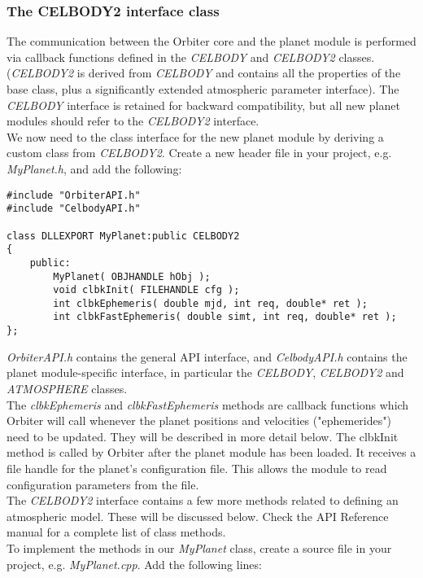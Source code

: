 \documentclass[Orbiter Developer Manual.tex]{subfiles}
\begin{document}
\subsubsection{The CELBODY2 interface class}
The communication between the Orbiter core and the planet module is performed via callback functions defined in the \textit{CELBODY} and \textit{CELBODY2} classes. (\textit{CELBODY2} is derived from \textit{CELBODY} and contains all the properties of the base class, plus a significantly extended atmospheric parameter interface). The \textit{CELBODY} interface is retained for backward compatibility, but all new planet modules should refer to the \textit{CELBODY2} interface.\\
We now need to the class interface for the new planet module by deriving a custom class from \textit{CELBODY2}. Create a new header file in your project, e.g. \textit{MyPlanet.h}, and add the following:

\begin{lstlisting}
#include "OrbiterAPI.h"
#include "CelbodyAPI.h"

class DLLEXPORT MyPlanet:public CELBODY2
{
	public:
		MyPlanet( OBJHANDLE hObj );
		void clbkInit( FILEHANDLE cfg );
		int clbkEphemeris( double mjd, int req, double* ret );
		int clbkFastEphemeris( double simt, int req, double* ret );
};
\end{lstlisting}

\noindent
\textit{OrbiterAPI.h} contains the general API interface, and \textit{CelbodyAPI.h} contains the planet module-specific interface, in particular the \textit{CELBODY}, \textit{CELBODY2} and \textit{ATMOSPHERE} classes.\\
The \textit{clbkEphemeris} and \textit{clbkFastEphemeris} methods are callback functions which Orbiter will call whenever the planet positions and velocities ("ephemerides") need to be updated. They will be described in more detail below. The clbkInit method is called by Orbiter after the planet module has been loaded. It receives a file handle for the planet's configuration file. This allows the module to read configuration parameters from the file.\\
The \textit{CELBODY2} interface contains a few more methods related to defining an atmospheric model. These will be discussed below. Check the API Reference manual for a complete list of class methods.\\
To implement the methods in our \textit{MyPlanet} class, create a source file in your project, e.g. \textit{MyPlanet.cpp}. Add the following lines:
\end{document}
